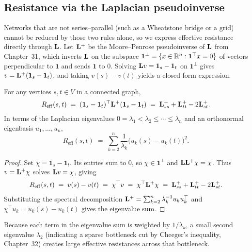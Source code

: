 \subsection{Resistance via the Laplacian pseudoinverse}

Networks that are not series--parallel (such as a Wheatstone bridge or a grid) cannot be reduced by those two rules alone, so we express effective resistance directly through $\mathbf{L}$. Let $\mathbf{L}^{+}$ be the Moore--Penrose pseudoinverse of $\mathbf{L}$ from Chapter~31, which inverts $\mathbf{L}$ on the subspace $\mathbf{1}^\perp = \{x\in\mathbb{R}^n : \mathbf{1}^\top x = 0\}$ of vectors perpendicular to $\mathbf{1}$ and sends $\mathbf{1}$ to $0$. Solving $\mathbf{L} v=\mathbf{1}_s-\mathbf{1}_t$ on $\mathbf{1}^\perp$ gives $v=\mathbf{L}^{+}(\mathbf{1}_s-\mathbf{1}_t)$, and taking $v(s)-v(t)$ yields a closed-form expression.

\begin{theorem}\label{ch35:thm-reffform}
For any vertices $s,t\in V$ in a connected graph,
\[
  R_{\mathrm{eff}}(s,t)
  \;=\;(\mathbf{1}_s-\mathbf{1}_t)^\top \mathbf{L}^{+}(\mathbf{1}_s-\mathbf{1}_t)
  \;=\;\mathbf{L}^{+}_{ss}+\mathbf{L}^{+}_{tt}-2\mathbf{L}^{+}_{st}.
\]
In terms of the Laplacian eigenvalues $0=\lambda_1<\lambda_2\le\cdots\le\lambda_n$ and an orthonormal eigenbasis $u_1,\dots,u_n$,
\[
  R_{\mathrm{eff}}(s,t) \;=\; \sum_{k=2}^{n}\frac{1}{\lambda_k}\bigl(u_k(s)-u_k(t)\bigr)^2.
\]
\end{theorem}

\begin{proof}
Set $\chi=\mathbf{1}_s-\mathbf{1}_t$. Its entries sum to $0$, so $\chi\in\mathbf{1}^\perp$ and $\mathbf{L}\mathbf{L}^+\chi=\chi$. Thus $v=\mathbf{L}^+\chi$ solves $\mathbf{L} v=\chi$, giving
\[
  R_{\mathrm{eff}}(s,t) \;=\; v(s)-v(t) \;=\; \chi^\top v \;=\; \chi^\top\mathbf{L}^+\chi \;=\; \mathbf{L}^{+}_{ss}+\mathbf{L}^{+}_{tt}-2\mathbf{L}^{+}_{st}.
\]
Substituting the spectral decomposition $\mathbf{L}^+=\sum_{k=2}^{n}\lambda_k^{-1}u_ku_k^\top$ and $\chi^\top u_k=u_k(s)-u_k(t)$ gives the eigenvalue sum.
\end{proof}

Because each term in the eigenvalue sum is weighted by $1/\lambda_k$, a small second eigenvalue $\lambda_2$ (indicating a sparse bottleneck cut by Cheeger's inequality, Chapter~32) creates large effective resistances across that bottleneck.

